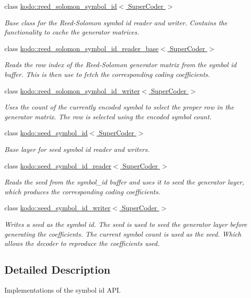 \begin{DoxyCompactItemize}
class \hyperlink{classkodo_1_1reed__solomon__symbol__id}{kodo\-::reed\-\_\-solomon\-\_\-symbol\-\_\-id$<$ Super\-Coder $>$}
\begin{DoxyCompactList}\small\item\em Base class for the Reed-\/\-Solomon symbol id reader and writer. Contains the functionality to cache the generator matrices. \end{DoxyCompactList}\item 
class \hyperlink{classkodo_1_1reed__solomon__symbol__id__reader__base}{kodo\-::reed\-\_\-solomon\-\_\-symbol\-\_\-id\-\_\-reader\-\_\-base$<$ Super\-Coder $>$}
\begin{DoxyCompactList}\small\item\em Reads the row index of the Reed-\/\-Solomon generator matrix from the symbol id buffer. This is then use to fetch the corresponding coding coefficients. \end{DoxyCompactList}\item 
class \hyperlink{classkodo_1_1reed__solomon__symbol__id__writer}{kodo\-::reed\-\_\-solomon\-\_\-symbol\-\_\-id\-\_\-writer$<$ Super\-Coder $>$}
\begin{DoxyCompactList}\small\item\em Uses the count of the currently encoded symbol to select the proper row in the generator matrix. The row is selected using the encoded symbol count. \end{DoxyCompactList}\item 
class \hyperlink{classkodo_1_1seed__symbol__id}{kodo\-::seed\-\_\-symbol\-\_\-id$<$ Super\-Coder $>$}
\begin{DoxyCompactList}\small\item\em Base layer for seed symbol id reader and writers. \end{DoxyCompactList}\item 
class \hyperlink{classkodo_1_1seed__symbol__id__reader}{kodo\-::seed\-\_\-symbol\-\_\-id\-\_\-reader$<$ Super\-Coder $>$}
\begin{DoxyCompactList}\small\item\em Reads the seed from the symbol\-\_\-id buffer and uses it to seed the generator layer, which produces the corresponding coding coefficients. \end{DoxyCompactList}\item 
class \hyperlink{classkodo_1_1seed__symbol__id__writer}{kodo\-::seed\-\_\-symbol\-\_\-id\-\_\-writer$<$ Super\-Coder $>$}
\begin{DoxyCompactList}\small\item\em Writes a seed as the symbol id. The seed is used to seed the generator layer before generating the coefficients. The current symbol count is used as the seed. Which allows the decoder to reproduce the coefficients used. \end{DoxyCompactList}\end{DoxyCompactItemize}


\subsection{Detailed Description}
Implementations of the symbol id A\-P\-I. 